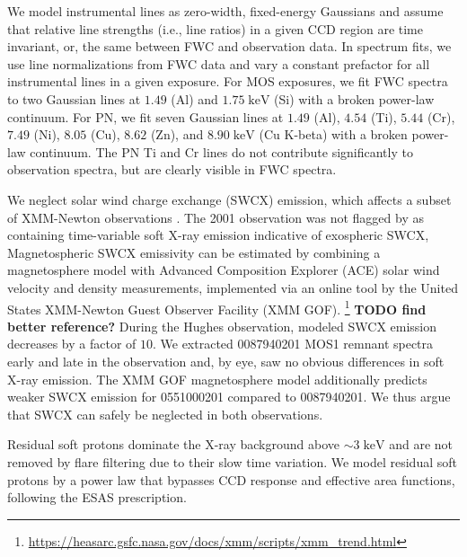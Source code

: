 \documentclass[preprint2,tighten,trackchanges]{aastex6}
\newcommand*{\mt}{\mathrm}
\newcommand*{\unit}[1]{\;\mt{#1}}  %
\begin{document}
We model instrumental lines as zero-width, fixed-energy Gaussians and assume
that relative line strengths (i.e., line ratios) in a given CCD region are time
invariant, or, the same between FWC and observation data.
In spectrum fits, we use line normalizations from FWC data and vary a constant
prefactor for all instrumental lines in a given exposure.
For MOS exposures, we fit FWC spectra to two Gaussian lines at $1.49$ (Al) and
$1.75 \unit{keV}$ (Si) with a broken power-law continuum.
For PN, we fit seven Gaussian lines at $1.49$ (Al), $4.54$ (Ti), $5.44$ (Cr),
$7.49$ (Ni), $8.05$ (Cu), $8.62$ (Zn), and $8.90 \unit{keV}$ (Cu K-beta) with a
broken power-law continuum.
The PN Ti and Cr lines do not contribute significantly to observation spectra,
but are clearly visible in FWC spectra.

We neglect solar wind charge exchange (SWCX) emission, which affects a subset
of XMM-Newton observations \citep{snowden2004}.
The 2001 observation was not flagged by \citet{carter2011} as
containing time-variable soft X-ray emission indicative of exospheric SWCX,
Magnetospheric SWCX emissivity can be estimated by combining a magnetosphere
model \citep{spreiter1966} with Advanced Composition Explorer (ACE) solar wind
velocity and density measurements, implemented via an online tool by the United
States XMM-Newton Guest Observer Facility (XMM GOF).
\footnote{\href{https://heasarc.gsfc.nasa.gov/docs/xmm/scripts/xmm_trend.html}{https://heasarc.gsfc.nasa.gov/docs/xmm/scripts/xmm\_trend.html}}
\textbf{TODO find better reference?}  %
During the Hughes observation, modeled SWCX emission decreases by a
factor of $10$.
We extracted 0087940201 MOS1 remnant spectra early and late in the observation
and, by eye, saw no obvious differences in soft X-ray emission.
The XMM GOF magnetosphere model additionally predicts weaker SWCX emission for
0551000201 compared to 0087940201.
We thus argue that SWCX can safely be neglected in both observations.


Residual soft protons dominate the X-ray background above $\sim 3 \unit{keV}$
and are not removed by flare filtering due to their slow time variation.
We model residual soft protons by a power law that bypasses CCD response and
effective area functions, following the ESAS prescription.
\end{document}
